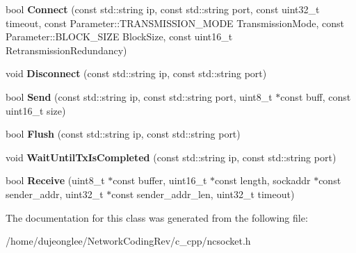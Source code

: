 \begin{DoxyCompactItemize}
\item 
bool {\bfseries Connect} (const std\+::string ip, const std\+::string port, const uint32\+\_\+t timeout, const Parameter\+::\+T\+R\+A\+N\+S\+M\+I\+S\+S\+I\+O\+N\+\_\+\+M\+O\+DE Transmission\+Mode, const Parameter\+::\+B\+L\+O\+C\+K\+\_\+\+S\+I\+ZE Block\+Size, const uint16\+\_\+t Retransmission\+Redundancy)\hypertarget{class_network_coding_1_1_n_c_socket_a1374c825f9a5403fbccf48b55ba051fd}{}\label{class_network_coding_1_1_n_c_socket_a1374c825f9a5403fbccf48b55ba051fd}

\item 
void {\bfseries Disconnect} (const std\+::string ip, const std\+::string port)\hypertarget{class_network_coding_1_1_n_c_socket_a96394c488e1f394c624202c85a60e9e0}{}\label{class_network_coding_1_1_n_c_socket_a96394c488e1f394c624202c85a60e9e0}

\item 
bool {\bfseries Send} (const std\+::string ip, const std\+::string port, uint8\+\_\+t $\ast$const buff, const uint16\+\_\+t size)\hypertarget{class_network_coding_1_1_n_c_socket_a68d0a54287a8ccaad0635cac3e24d8b2}{}\label{class_network_coding_1_1_n_c_socket_a68d0a54287a8ccaad0635cac3e24d8b2}

\item 
bool {\bfseries Flush} (const std\+::string ip, const std\+::string port)\hypertarget{class_network_coding_1_1_n_c_socket_a2a507dbb11c5c85c1604c45466f2ae87}{}\label{class_network_coding_1_1_n_c_socket_a2a507dbb11c5c85c1604c45466f2ae87}

\item 
void {\bfseries Wait\+Until\+Tx\+Is\+Completed} (const std\+::string ip, const std\+::string port)\hypertarget{class_network_coding_1_1_n_c_socket_ac7d30bf07839598f790e702766e720cd}{}\label{class_network_coding_1_1_n_c_socket_ac7d30bf07839598f790e702766e720cd}

\item 
bool {\bfseries Receive} (uint8\+\_\+t $\ast$const buffer, uint16\+\_\+t $\ast$const length, sockaddr $\ast$const sender\+\_\+addr, uint32\+\_\+t $\ast$const sender\+\_\+addr\+\_\+len, uint32\+\_\+t timeout)\hypertarget{class_network_coding_1_1_n_c_socket_afb8b2cf0fa29cd712f4cee4edc6d71b8}{}\label{class_network_coding_1_1_n_c_socket_afb8b2cf0fa29cd712f4cee4edc6d71b8}

\end{DoxyCompactItemize}


The documentation for this class was generated from the following file\+:\begin{DoxyCompactItemize}
\item 
/home/dujeonglee/\+Network\+Coding\+Rev/c\+\_\+cpp/ncsocket.\+h\end{DoxyCompactItemize}
